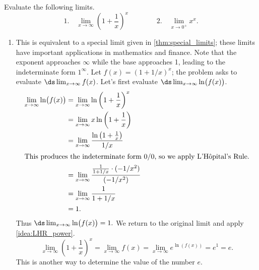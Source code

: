 \begin{example}\label{ex_LHR4}%
Evaluate the following limits.
\[
 \text{1.}\quad\lim_{x\to\infty} \left(1+\frac1x\right)^x \qquad\qquad
 \text{2.}\quad\lim_{x\to0^+} x^x.
\]
\solution
\begin{enumerate}
\item		This is equivalent to a special limit given in \autoref{thm:special_limits}; these limits have important applications in mathematics and finance. Note that the exponent approaches $\infty$ while the base approaches 1, leading to the indeterminate form $1^\infty$. Let $f(x) = (1+1/x)^x$; the problem asks to evaluate $\ds\lim_{x\to\infty}f(x)$. Let's first evaluate $\ds \lim_{x\to\infty}\ln\bigl(f(x)\bigr)$.
\begin{align*}
\lim_{x\to\infty}\ln\bigl(f(x)\bigr)
			&= \lim_{x\to\infty} \ln \left(1+\frac1x\right)^x \\
			&= \lim_{x\to\infty} x\ln\left(1+\frac1x\right)\\
			&= \lim_{x\to\infty} \frac{\ln\left(1+\frac1x\right)}{1/x}\\
			\intertext{This produces the indeterminate form 0/0, so we apply L'Hôpital's Rule.}
			&=	\lim_{x\to\infty} \frac{\frac{1}{1+1/x}\cdot(-1/x^2)}{(-1/x^2)} \\
			&= \lim_{x\to\infty}\frac{1}{1+1/x}\\
			&= 1.
\end{align*}
Thus $\ds\lim_{x\to\infty} \ln \bigl(f(x)\bigr) = 1.$ We return to the original limit and apply \autoref{idea:LHR_power}.
\[\lim_{x\to\infty}\left(1+\frac1x\right)^x = \lim_{x\to\infty} f(x) =  \lim_{x\to\infty}e^{\ln (f(x))} = e^1 = e.\]
This is another way to determine the value of the number $e$.


\end{enumerate}
\end{example}
